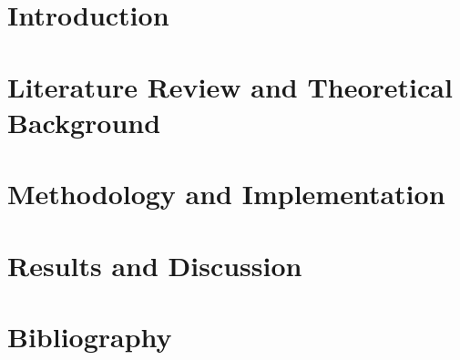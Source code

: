 \documentclass[12pt, a4paper, twoside]{book}
\begin{document}
\frontmatter









\tableofcontents
\listoffigures
\listoftables



\mainmatter

\chapter{Introduction}


\chapter{Literature Review and Theoretical Background}


\chapter{Methodology and Implementation}


\chapter{Results and Discussion}


% 

\backmatter

\chapter*{Bibliography}
\nocite{*}  %
\printbibliography

\end{document}
